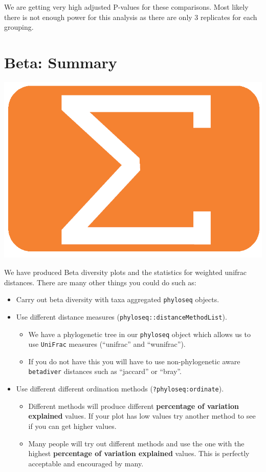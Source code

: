 \documentclass[
]{book}
\providecommand{\tightlist}{%
  \setlength{\itemsep}{0pt}\setlength{\parskip}{0pt}}
\begin{document}
We are getting very high adjusted P-values for these comparisons.
Most likely there is not enough power for this analysis as there are only 3 replicates for each grouping.

\hypertarget{beta-summary}{%
\section{Beta: Summary}\label{beta-summary}}

\includegraphics{figures/sum_orange.png}

We have produced Beta diversity plots and the statistics for weighted unifrac distances.
There are many other things you could do such as:

\begin{itemize}
\tightlist
\item
  Carry out beta diversity with taxa aggregated \texttt{phyloseq} objects.
\item
  Use different distance measures (\texttt{phyloseq::distanceMethodList}).

  \begin{itemize}
  \tightlist
  \item
    We have a phylogenetic tree in our \texttt{phyloseq} object which allows us to use \texttt{UniFrac} measures (``unifrac'' and ``wunifrac'').
  \item
    If you do not have this you will have to use non-phylogenetic aware \texttt{betadiver} distances such as ``jaccard'' or ``bray''.
  \end{itemize}
\item
  Use different different ordination methods (\texttt{?phyloseq:ordinate}).

  \begin{itemize}
  \tightlist
  \item
    Different methods will produce different \textbf{percentage of variation explained} values. If your plot has low values try another method to see if you can get higher values.
  \item
    Many people will try out different methods and use the one with the highest \textbf{percentage of variation explained} values. This is perfectly acceptable and encouraged by many.
  \end{itemize}
\end{itemize}
\end{document}
